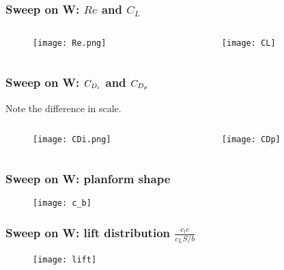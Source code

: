 \documentclass[aspectratio=169,xcolor={dvipsnames}]{beamer}
\begin{document}
\begin{frame}
	\frametitle{Sweep on W: $Re$ and $C_L$}
	\begin{columns} 

		 \begin{column}{0.5\textwidth}
		   \begin{figure}
			   \texttt{[image: Re.png]}
			   \raggedleft
		  \end{figure}
		 \end{column}

		 \begin{column}{0.5\textwidth}
			  \begin{figure}
				   \texttt{[image: CL]}
				   \raggedright
			  \end{figure}
		 \end{column}

	\end{columns}
\end{frame}

\begin{frame}
	\frametitle{Sweep on W: $C_{D_i}$ and $C_{D_p}$}
	Note the difference in scale.
	\begin{columns} 

		 \begin{column}{0.5\textwidth}
		   \begin{figure}
			   \texttt{[image: CDi.png]}
			   \raggedleft
		  \end{figure}
		 \end{column}

		 \begin{column}{0.5\textwidth}
			  \begin{figure}
				   \texttt{[image: CDp]}
				   \raggedright
			  \end{figure}
		 \end{column}

	\end{columns}
\end{frame}
			
\begin{frame}
	\frametitle{Sweep on W: planform shape}
	\begin{figure}
		\texttt{[image: c\_b]}
		\centering
	\end{figure}
\end{frame}

\begin{frame}
	\frametitle{Sweep on W: lift distribution $\frac{c_l c}{c_L S/b}$}
	\begin{figure}
		\texttt{[image: lift]}
		\centering
	\end{figure}
\end{frame}
\end{document}
